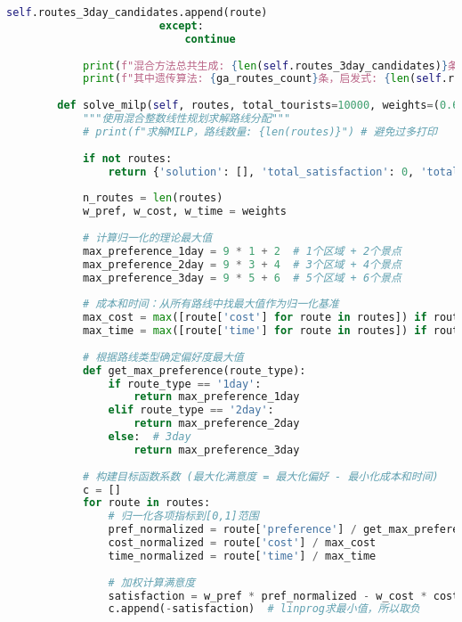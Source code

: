 \begin{lstlisting}[language=Python]
                            self.routes_3day_candidates.append(route)
                        except:
                            continue
            
            print(f"混合方法总共生成: {len(self.routes_3day_candidates)}条路线")
            print(f"其中遗传算法: {ga_routes_count}条，启发式: {len(self.routes_3day_candidates) - ga_routes_count}条")
        
        def solve_milp(self, routes, total_tourists=10000, weights=(0.6, 0.2, 0.2)):
            """使用混合整数线性规划求解路线分配"""
            # print(f"求解MILP，路线数量: {len(routes)}") # 避免过多打印
            
            if not routes:
                return {'solution': [], 'total_satisfaction': 0, 'total_tourists': 0} # 返回包含总满意度和总游客数的字典
            
            n_routes = len(routes)
            w_pref, w_cost, w_time = weights
            
            # 计算归一化的理论最大值
            max_preference_1day = 9 * 1 + 2  # 1个区域 + 2个景点
            max_preference_2day = 9 * 3 + 4  # 3个区域 + 4个景点  
            max_preference_3day = 9 * 5 + 6  # 5个区域 + 6个景点
            
            # 成本和时间：从所有路线中找最大值作为归一化基准
            max_cost = max([route['cost'] for route in routes]) if routes else 1
            max_time = max([route['time'] for route in routes]) if routes else 1
            
            # 根据路线类型确定偏好度最大值
            def get_max_preference(route_type):
                if route_type == '1day':
                    return max_preference_1day
                elif route_type == '2day':
                    return max_preference_2day
                else:  # 3day
                    return max_preference_3day
            
            # 构建目标函数系数 (最大化满意度 = 最大化偏好 - 最小化成本和时间)
            c = []
            for route in routes:
                # 归一化各项指标到[0,1]范围
                pref_normalized = route['preference'] / get_max_preference(route['type'])
                cost_normalized = route['cost'] / max_cost
                time_normalized = route['time'] / max_time
                
                # 加权计算满意度
                satisfaction = w_pref * pref_normalized - w_cost * cost_normalized - w_time * time_normalized
                c.append(-satisfaction)  # linprog求最小值，所以取负
            

\end{lstlisting}
